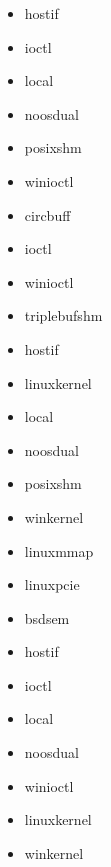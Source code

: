 \begin{description}[leftmargin=0cm]
    \item[error handler] \mbox{}
    \begin{multicols}{3}
        \begin{itemize}
            \item hostif
            \item ioctl
            \item local
            \item noosdual
            \item posixshm
            \item winioctl
        \end{itemize}
    \end{multicols}
    
    \item[DLL] \mbox{}
    \begin{multicols}{3}
        \begin{itemize}
            \item circbuff
            \item ioctl
            \item winioctl
        \end{itemize}
    \end{multicols}
    
    \item[PDO] \mbox{}
    \begin{multicols}{3}
        \begin{itemize}
            \item triplebufshm
            \item hostif
            \item linuxkernel
            \item local
            \item noosdual
            \item posixshm
            \item winkernel
            \item linuxmmap
            \item linuxpcie
        \end{itemize}
    \end{multicols}
    
    \item[time sync] \mbox{}
    \begin{multicols}{3}
        \begin{itemize}
            \item bsdsem
            \item hostif
            \item ioctl
            \item local
            \item noosdual
            \item winioctl
            \item linuxkernel
            \item winkernel
        \end{itemize}
    \end{multicols}
\end{description}

